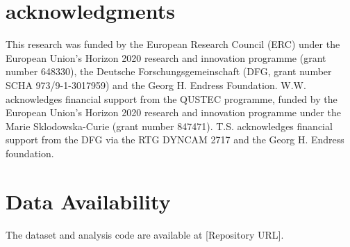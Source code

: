 \documentclass[aps,pra,reprint,groupedaddress,twocolumn,superscriptaddress,linenumbers]{revtex4-2}
\begin{document}
\section{acknowledgments}
This research was funded by the European Research Council (ERC) under the European Union’s Horizon 2020 research and innovation programme (grant number 648330), the Deutsche Forschungsgemeinschaft (DFG, grant number SCHA 973/9-1-3017959) and the Georg H. Endress Foundation. W.W. acknowledges financial support from the QUSTEC programme, funded by the European Union’s Horizon 2020 research and innovation programme under the Marie Sklodowska-Curie (grant number 847471). T.S. acknowledges financial support from the DFG via the RTG DYNCAM 2717 and the Georg H. Endress foundation.

\section{Data Availability}

The dataset and analysis code are available at [Repository URL].

\nocite{*}


\end{document}
